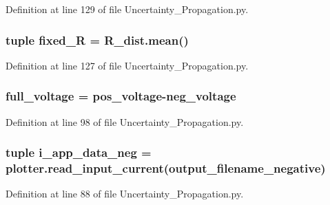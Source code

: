 Definition at line 129 of file Uncertainty\-\_\-\-Propagation.\-py.

\hypertarget{namespace_uncertainty___propagation_a717d6bc98a4bbaa2fa30403b79e42b1e}{
\subsubsection[{fixed\-\_\-\-R}]{\setlength{\rightskip}{0pt plus 5cm}tuple fixed\-\_\-\-R = R\-\_\-dist.\-mean()}}\label{namespace_uncertainty___propagation_a717d6bc98a4bbaa2fa30403b79e42b1e}


Definition at line 127 of file Uncertainty\-\_\-\-Propagation.\-py.

\hypertarget{namespace_uncertainty___propagation_a103c299bf7e3807650c8012aa93a5953}{
\subsubsection[{full\-\_\-voltage}]{\setlength{\rightskip}{0pt plus 5cm}full\-\_\-voltage = {\bf pos\-\_\-voltage}-\/{\bf neg\-\_\-voltage}}}\label{namespace_uncertainty___propagation_a103c299bf7e3807650c8012aa93a5953}


Definition at line 98 of file Uncertainty\-\_\-\-Propagation.\-py.

\hypertarget{namespace_uncertainty___propagation_af0c0656dcb2e67c34296832b7bf7a499}{
\subsubsection[{i\-\_\-app\-\_\-data\-\_\-neg}]{\setlength{\rightskip}{0pt plus 5cm}tuple i\-\_\-app\-\_\-data\-\_\-neg = {\bf plotter.\-read\-\_\-input\-\_\-current}(output\-\_\-filename\-\_\-negative)}}\label{namespace_uncertainty___propagation_af0c0656dcb2e67c34296832b7bf7a499}


Definition at line 88 of file Uncertainty\-\_\-\-Propagation.\-py.

